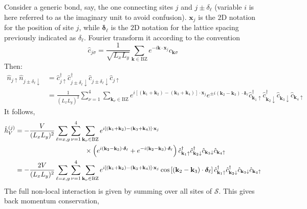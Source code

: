 {\color{tabred}

Consider a generic bond, say, the one connecting sites $j$ and $j\pm\delta_\ell$ (variable $i$ is here referred to as the imaginary unit to avoid confusion). $\mathbf{x}_j$ is the $2$D notation for the position of site $j$, while $\bm{\delta}_\ell$ is the $2$D notation for the lattice spacing previously indicated as $\delta_\ell$. Fourier transform it according to the convention
\[
	\hat c_{j\sigma} = \frac{1}{\sqrt{L_xL_y}} \sum_{\mathbf{k} \in \mathrm{BZ}} e^{-i \mathbf{k} \cdot \mathbf{x}_j} \hat c_{\mathbf{k}\sigma}
\]
Then:
\[
\begin{aligned}
	\hat n_{j\uparrow} \hat n_{j \pm \delta_\ell \downarrow} &= \hat c_{j\uparrow}^\dagger \hat c_{j \pm \delta_\ell \downarrow}^\dagger \hat c_{j \pm \delta_\ell \downarrow} \hat c_{j\uparrow} \\
	&= \frac{1}{(L_xL_y)^2} \sum_{\nu=1}^4 \sum_{\mathbf{k}_\nu \in \mathrm{BZ}} e^{i \left[ (\mathbf{k}_1 + \mathbf{k}_2) - (\mathbf{k}_3 + \mathbf{k}_4) \right] \cdot \mathbf{x}_j} e^{\pm i(\mathbf{k}_2-\mathbf{k}_3) \cdot \bm{\delta}_\ell}  \hat c_{\mathbf{k}_1 \uparrow}^\dagger \hat c_{\mathbf{k}_2 \downarrow}^\dagger \hat c_{\mathbf{k}_3 \downarrow} \hat c_{\mathbf{k}_4\uparrow}
\end{aligned}
\]
It follows,
\[
\begin{aligned}
	\hat h_V^{(j)} &= -\frac{V}{(L_xL_y)^2} \sum_{\ell = x,y} \sum_{\nu=1}^4 \sum_{\mathbf{k}_\nu \in \mathrm{BZ}} e^{i \left[ (\mathbf{k}_1 + \mathbf{k}_2) - (\mathbf{k}_3 + \mathbf{k}_4) \right] \cdot \mathbf{x}_j} \\
	&\hspace{0.3\textwidth} \times \left(
	e^{ i(\mathbf{k}_2-\mathbf{k}_3) \cdot \bm{\delta}_\ell} + e^{ -i(\mathbf{k}_2-\mathbf{k}_3) \cdot \bm{\delta}_\ell} 
	\right)
	\hat c_{\mathbf{k}_1 \uparrow}^\dagger \hat c_{\mathbf{k}_2 \downarrow}^\dagger \hat c_{\mathbf{k}_3 \downarrow} \hat c_{\mathbf{k}_4\uparrow} \\
	&= -\frac{2V}{(L_xL_y)^2} \sum_{\ell = x,y} \sum_{\nu=1}^4 \sum_{\mathbf{k}_\nu \in \mathrm{BZ}} e^{i \left[ (\mathbf{k}_1 + \mathbf{k}_2) - (\mathbf{k}_3 + \mathbf{k}_4) \right] \cdot \mathbf{x}_j} \cos\left[
	(\mathbf{k}_2-\mathbf{k}_3) \cdot \bm{\delta}_\ell
	\right]	\hat c_{\mathbf{k}_1 \uparrow}^\dagger \hat c_{\mathbf{k}_2 \downarrow}^\dagger \hat c_{\mathbf{k}_3 \downarrow} \hat c_{\mathbf{k}_4\uparrow}
\end{aligned}
\]
The full non-local interaction is given by summing over all sites of $\mathcal{S}$. This gives back momentum conservation,
}
